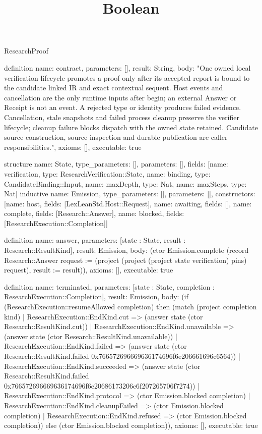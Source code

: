 \begin{lexlean}{ResearchProof}
\title{Boolean}
\begin{semanticmodule}

definition{
 name: contract,
 parameters: [],
 result: String,
 body: "One owned local verification lifecycle promotes a proof only after its accepted report is bound to the candidate linked IR and exact contextual sequent. Host events and cancellation are the only runtime inputs after begin; an external Answer or Receipt is not an event. A rejected type or identity produces failed evidence. Cancellation, stale snapshots and failed process cleanup preserve the verifier lifecycle; cleanup failure blocks dispatch with the owned state retained. Candidate source construction, source inspection and durable publication are caller responsibilities.",
 axioms: [],
 executable: true
}

structure{
 name: State,
 type_parameters: [],
 parameters: [],
 fields: [{name: verification, type: ResearchVerification::State}, {name: binding, type: CandidateBinding::Input}, {name: maxDepth, type: Nat}, {name: maxSteps, type: Nat}]
}
inductive{
 name: Emission,
 type_parameters: [],
 parameters: [],
 constructors: [{name: host, fields: [LexLeanStd.Host::Request]}, {name: awaiting, fields: []}, {name: complete, fields: [Research::Answer]}, {name: blocked, fields: [ResearchExecution::Completion]}]
}

definition{
 name: answer,
 parameters: [state : State, result : Research::ResultKind],
 result: Emission,
 body: (ctor Emission.complete (record Research::Answer {request := (project (project (project state verification) pins) request), result := result})),
 axioms: [],
 executable: true
}

definition{
 name: terminated,
 parameters: [state : State, completion : ResearchExecution::Completion],
 result: Emission,
 body: (if (ResearchExecution::resumeAllowed completion) then (match (project completion kind)
 | ResearchExecution::EndKind.cut => (answer state (ctor Research::ResultKind.cut))
 | ResearchExecution::EndKind.unavailable => (answer state (ctor Research::ResultKind.unavailable))
 | ResearchExecution::EndKind.failed => (answer state (ctor Research::ResultKind.failed 0x766572696669636174696f6e206661696c6564))
 | ResearchExecution::EndKind.succeeded => (answer state (ctor Research::ResultKind.failed 0x766572696669636174696f6e20686173206e6f207265706f7274))
 | ResearchExecution::EndKind.protocol => (ctor Emission.blocked completion)
 | ResearchExecution::EndKind.cleanupFailed => (ctor Emission.blocked completion)
 | ResearchExecution::EndKind.refused => (ctor Emission.blocked completion)) else (ctor Emission.blocked completion)),
 axioms: [],
 executable: true
}


\end{semanticmodule}
\end{lexlean}
